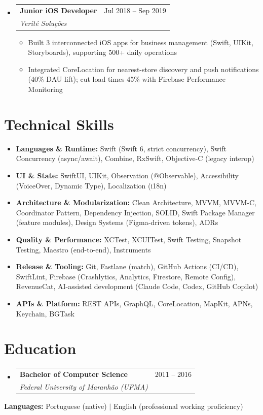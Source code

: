 \documentclass[11pt,letterpaper]{article}
\makeatletter
\newcommand{\resumeSubheading}[4]{
  \item
    \begin{tabular*}{\linewidth}{l@{\extracolsep{\fill}}r}
      \textbf{#1} & #2 \\
      \textit{#3} & \textit{#4} \\
    \end{tabular*}
}
\newcommand{\resumeItem}[1]{
  \item{#1}
}
\makeatother
\begin{document}
\begin{itemize}[leftmargin=0.15in, label={}]
    \resumeSubheading
        {Junior iOS Developer}{Jul 2018 -- Sep 2019}
        {Verité Soluções}{}
        \begin{itemize}
            \resumeItem{Built 3 interconnected iOS apps for business management (Swift, UIKit, Storyboards), supporting 500+ daily operations}
            \resumeItem{Integrated CoreLocation for nearest-store discovery and push notifications (40\% DAU lift); cut load times 45\% with Firebase Performance Monitoring}
        \end{itemize}
\end{itemize}

\section*{Technical Skills}

\begin{itemize}[leftmargin=0.15in, label={}]
    \item \textbf{Languages \& Runtime:} Swift (Swift 6, strict concurrency), Swift Concurrency (async/await), Combine, RxSwift, Objective-C (legacy interop)
    \item \textbf{UI \& State:} SwiftUI, UIKit, Observation (\mbox{@Observable}), Accessibility (VoiceOver, Dynamic Type), Localization (i18n)
    \item \textbf{Architecture \& Modularization:} Clean Architecture, MVVM, MVVM-C, Coordinator Pattern, Dependency Injection, SOLID, Swift Package Manager (feature modules), Design Systems (Figma-driven tokens), ADRs
    \item \textbf{Quality \& Performance:} XCTest, XCUITest, Swift Testing, Snapshot Testing, Maestro (end-to-end), Instruments
    \item \textbf{Release \& Tooling:} Git, Fastlane (match), GitHub Actions (CI/CD), SwiftLint, Firebase (Crashlytics, Analytics, Firestore, Remote Config), RevenueCat, AI-assisted development (Claude Code, Codex, GitHub Copilot)
    \item \textbf{APIs \& Platform:} REST APIs, GraphQL, CoreLocation, MapKit, APNs, Keychain, BGTask
\end{itemize}

\section*{Education}

\begin{itemize}[leftmargin=0.15in, label={}]
    \resumeSubheading
        {Bachelor of Computer Science}{2011 -- 2016}
        {Federal University of Maranhão (UFMA)}{}

\end{itemize}

\vspace{0.3em}
\noindent\textbf{Languages:} Portuguese (native) $|$ English (professional working proficiency)
\end{document}
